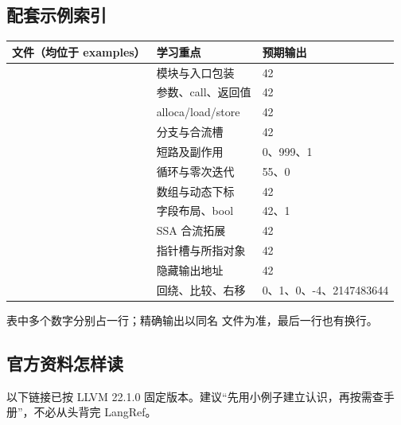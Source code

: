 \subsection{配套示例索引}
\begin{tabularx}{\linewidth}{@{}p{50mm}Yp{36mm}@{}}
\toprule
文件（均位于 examples） & 学习重点 & 预期输出 \\
\midrule
{} & 模块与入口包装 & 42 \\
 & 参数、call、返回值 & 42 \\
 & alloca/load/store & 42 \\
 & 分支与合流槽 & 42 \\
 & 短路及副作用 & 0、999、1 \\
 & 循环与零次迭代 & 55、0 \\
 & 数组与动态下标 & 42 \\
 & 字段布局、bool & 42、1 \\
 & SSA 合流拓展 & 42 \\
 & 指针槽与所指对象 & 42 \\
 & 隐藏输出地址 & 42 \\
 & 回绕、比较、右移 & 0、1、0、-4、2147483644 \\
\bottomrule
\end{tabularx}
表中多个数字分别占一行；精确输出以同名  文件为准，最后一行也有换行。

\subsection{官方资料怎样读}
以下链接已按 LLVM 22.1.0 固定版本。建议“先用小例子建立认识，再按需查手册”，不必从头背完 LangRef。

